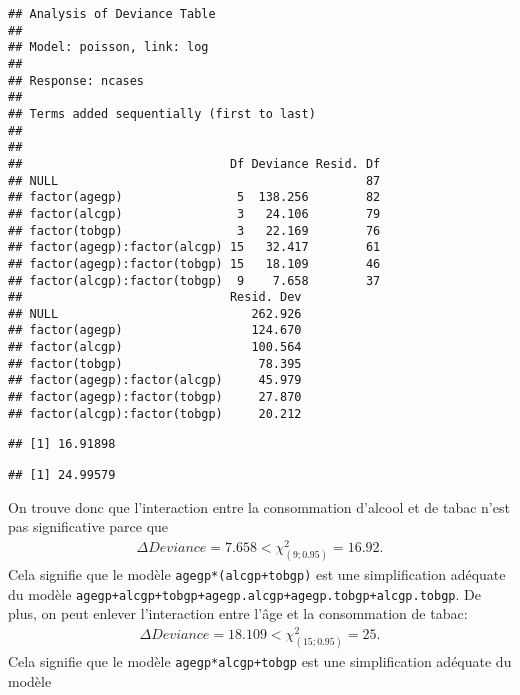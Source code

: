 \begin{solution}{6.1}
\begin{knitrout}
\begin{kframe}
{\ttfamily\noindent\color{warningcolor}{\#\# Warning: glm.fit: fitted rates numerically 0 occurred}}\begin{verbatim}
## Analysis of Deviance Table
##
## Model: poisson, link: log
##
## Response: ncases
##
## Terms added sequentially (first to last)
##
##
##                             Df Deviance Resid. Df
## NULL                                           87
## factor(agegp)                5  138.256        82
## factor(alcgp)                3   24.106        79
## factor(tobgp)                3   22.169        76
## factor(agegp):factor(alcgp) 15   32.417        61
## factor(agegp):factor(tobgp) 15   18.109        46
## factor(alcgp):factor(tobgp)  9    7.658        37
##                             Resid. Dev
## NULL                           262.926
## factor(agegp)                  124.670
## factor(alcgp)                  100.564
## factor(tobgp)                   78.395
## factor(agegp):factor(alcgp)     45.979
## factor(agegp):factor(tobgp)     27.870
## factor(alcgp):factor(tobgp)     20.212
\end{verbatim}
\begin{alltt}
\hlstd{(}\hlstd{,}\hlstd{)} 
\end{alltt}
\begin{verbatim}
## [1] 16.91898
\end{verbatim}
\begin{alltt}
\hlstd{(}\hlstd{,}\hlstd{)} 
\end{alltt}
\begin{verbatim}
## [1] 24.99579
\end{verbatim}
\end{kframe}
\end{knitrout}
On trouve donc que l'interaction entre la consommation d'alcool et de tabac n'est pas significative parce que
\begin{align*}
\Delta Deviance = 7.658 < \chi^{2}_{(9;0.95)}=16.92.
\end{align*}
Cela signifie que le modèle \texttt{agegp*(alcgp+tobgp)} est une simplification adéquate du modèle
\texttt{agegp+alcgp+tobgp+agegp.alcgp+agegp.tobgp+alcgp.tobgp}. De plus, on peut enlever l'interaction entre l'âge et la consommation de tabac:
\begin{align*}
\Delta Deviance = 18.109 < \chi^{2}_{(15;0.95)}=25.
\end{align*}
Cela signifie que le modèle \texttt{agegp*alcgp+tobgp} est une simplification adéquate du modèle

\end{solution}

